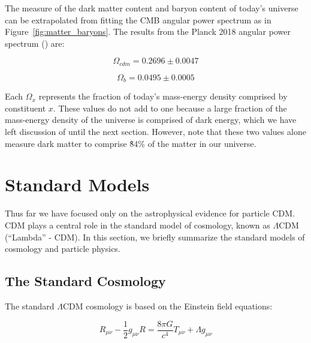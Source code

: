 The measure of the dark matter content and baryon content of today's universe can be extrapolated from fitting the \ac{CMB} angular power spectrum as in Figure~\ref{fig:matter_baryons}. The results from the Planck 2018 angular power spectrum (\cite{Planck2018}) are: 

\begin{equation}
\Omega_{cdm} = 0.2696 \pm 0.0047
\end{equation}

\begin{equation}
\Omega_{b}  = 0.0495 \pm 0.0005 
\end{equation}

Each $\Omega_{x}$ represents the fraction of today's mass-energy density comprised by constituent $x$. These values do not add to one because a large fraction of the mass-energy density of the universe is comprised of dark energy, which we have left discussion of until the next section. However, note that these two values alone measure dark matter to comprise \~84\% of the matter in our universe. 



\section{Standard Models}
Thus far we have focused only on the astrophysical evidence for particle \ac{CDM}. \ac{CDM} plays a central role in the standard model of cosmology, known as $\Lambda$\ac{CDM} (``Lambda'' - \ac{CDM}). In this section, we briefly summarize the standard models of cosmology and particle physics.

\subsection{The Standard Cosmology}
The standard $\Lambda$\ac{CDM} cosmology is based on the Einstein field equations:

\begin{equation}
R_{\mu \nu} - \frac{1}{2} g_{\mu \nu} R = \frac{8 \pi G}{c^{4}} T_{\mu \nu} + \Lambda g_{\mu\nu}
\end{equation}


